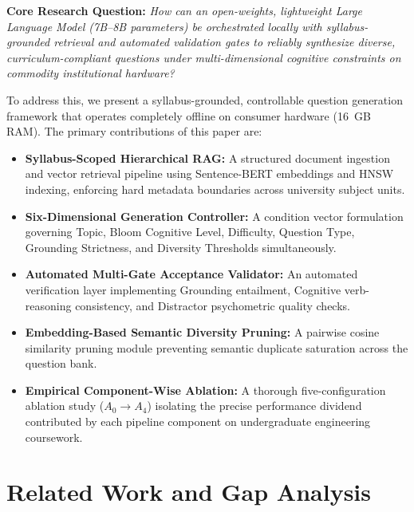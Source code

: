 \documentclass[conference]{IEEEtran}
\begin{document}
\textbf{Core Research Question:} \textit{How can an open-weights, lightweight Large Language Model (7B--8B parameters) be orchestrated locally with syllabus-grounded retrieval and automated validation gates to reliably synthesize diverse, curriculum-compliant questions under multi-dimensional cognitive constraints on commodity institutional hardware?}

To address this, we present a syllabus-grounded, controllable question generation framework that operates completely offline on consumer hardware (16~GB RAM). The primary contributions of this paper are:
\begin{itemize}
    \item \textbf{Syllabus-Scoped Hierarchical RAG:} A structured document ingestion and vector retrieval pipeline using Sentence-BERT embeddings and HNSW indexing, enforcing hard metadata boundaries across university subject units.
    \item \textbf{Six-Dimensional Generation Controller:} A condition vector formulation governing Topic, Bloom Cognitive Level, Difficulty, Question Type, Grounding Strictness, and Diversity Thresholds simultaneously.
    \item \textbf{Automated Multi-Gate Acceptance Validator:} An automated verification layer implementing Grounding entailment, Cognitive verb-reasoning consistency, and Distractor psychometric quality checks.
    \item \textbf{Embedding-Based Semantic Diversity Pruning:} A pairwise cosine similarity pruning module preventing semantic duplicate saturation across the question bank.
    \item \textbf{Empirical Component-Wise Ablation:} A thorough five-configuration ablation study ($A_0 \to A_4$) isolating the precise performance dividend contributed by each pipeline component on undergraduate engineering coursework.
\end{itemize}

\section{Related Work and Gap Analysis}
\end{document}
